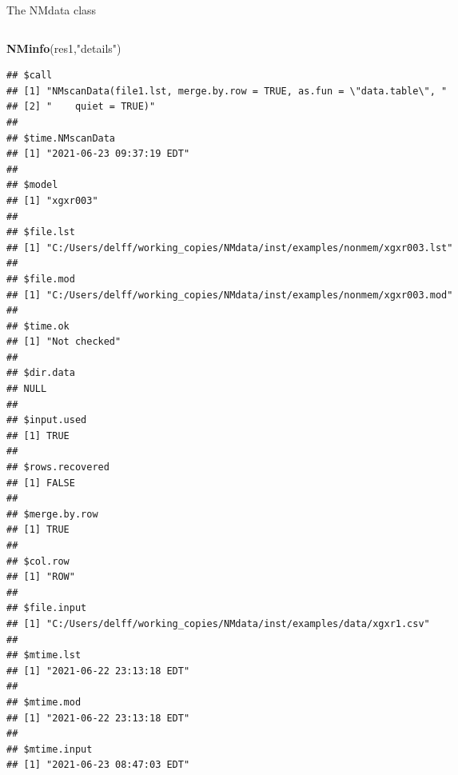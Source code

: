 \documentclass[
  8pt,
  ignorenonframetext,
  aspectratio=169]{beamer}
\newenvironment{Shaded}{\begin{snugshade}}{\end{snugshade}}
\newcommand{\KeywordTok}[1]{\textcolor[rgb]{0.13,0.29,0.53}{\textbf{#1}}}
\newcommand{\NormalTok}[1]{#1}
\newcommand{\StringTok}[1]{\textcolor[rgb]{0.31,0.60,0.02}{#1}}
\begin{document}
\begin{frame}[fragile]{The NMdata class}
\begin{columns}[T]
\begin{column}{0.48\textwidth}
\begin{Shaded}
\begin{Highlighting}[]
\KeywordTok{NMinfo}\NormalTok{(res1,}\StringTok{"details"}\NormalTok{)}
\end{Highlighting}
\end{Shaded}

\begin{verbatim}
## $call
## [1] "NMscanData(file1.lst, merge.by.row = TRUE, as.fun = \"data.table\", "
## [2] "    quiet = TRUE)"                                                   
## 
## $time.NMscanData
## [1] "2021-06-23 09:37:19 EDT"
## 
## $model
## [1] "xgxr003"
## 
## $file.lst
## [1] "C:/Users/delff/working_copies/NMdata/inst/examples/nonmem/xgxr003.lst"
## 
## $file.mod
## [1] "C:/Users/delff/working_copies/NMdata/inst/examples/nonmem/xgxr003.mod"
## 
## $time.ok
## [1] "Not checked"
## 
## $dir.data
## NULL
## 
## $input.used
## [1] TRUE
## 
## $rows.recovered
## [1] FALSE
## 
## $merge.by.row
## [1] TRUE
## 
## $col.row
## [1] "ROW"
## 
## $file.input
## [1] "C:/Users/delff/working_copies/NMdata/inst/examples/data/xgxr1.csv"
## 
## $mtime.lst
## [1] "2021-06-22 23:13:18 EDT"
## 
## $mtime.mod
## [1] "2021-06-22 23:13:18 EDT"
## 
## $mtime.input
## [1] "2021-06-23 08:47:03 EDT"
\end{verbatim}
\end{column}
\end{columns}
\end{frame}
\end{document}
